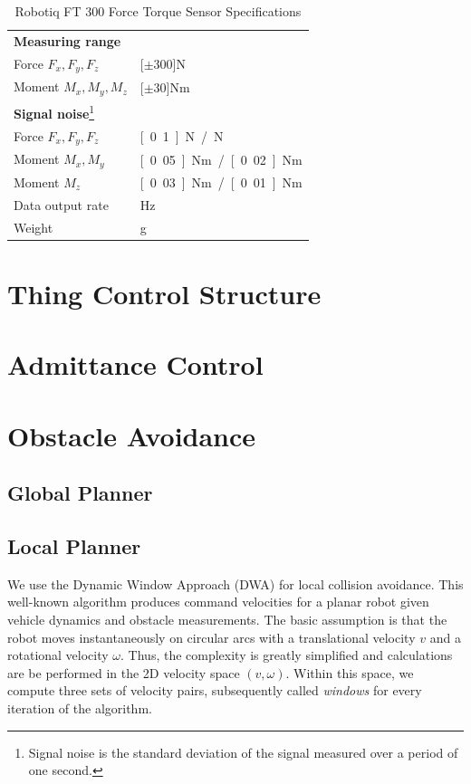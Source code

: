 \begin{savenotes}
\begin{table}[h]
\begin{center}
 \caption{Robotiq FT 300 Force Torque Sensor Specifications}\vspace{1ex}
 \label{tab:robotiq_ft}
 \begin{tabular}{ll}
 \hline
 \textbf{Measuring range} & \\
 Force $F_x, F_y, F_z$ & \unit[$\pm 300$]{N} \\
 Moment $M_x, M_y, M_z$ & \unit[$\pm 30$]{Nm} \\ \hline
 \textbf{Signal noise}\footnote{Signal noise is the standard deviation of the signal measured over a period of one second.} &\\
 Force $F_x, F_y, F_z$ & \unit[0.1]{N} / \unit[1]{N} \\
 Moment $M_x, M_y$ & \unit[0.05]{Nm} / \unit[0.02]{Nm} \\
 Moment $M_z$ & \unit[0.03]{Nm} / \unit[0.01]{Nm} \\ \hline
 Data output rate & \unit[100]{Hz} \\
 Weight & \unit[300]{g}\\
 \hline
 \end{tabular}
\end{center}
\end{table}
\end{savenotes}

\chapter{Thing Control Structure}

\chapter{Admittance Control}

\chapter{Obstacle Avoidance}
\section{Global Planner}
\section{Local Planner}

We use the Dynamic Window Approach (DWA) \citep{fox1997dynamic} for local collision avoidance. This well-known algorithm produces command velocities for a planar robot given vehicle dynamics and obstacle measurements. The basic assumption is that the robot moves instantaneously on circular arcs with a translational velocity $v$ and a rotational velocity $\omega$. Thus, the complexity is greatly simplified and calculations are be performed in the 2D velocity space $(v,\omega)$. Within this space, we compute three sets of velocity pairs,  subsequently called \emph{windows} for every iteration of the algorithm.

